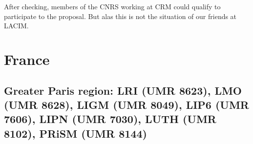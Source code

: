 After checking, members of the CNRS working at CRM could qualify to
participate to the proposal. But alas this is not the situation of our
friends at LACIM.

\section*{France}

\subsection*{Greater Paris region: LRI (UMR 8623),  LMO (UMR 8628), LIGM
  (UMR 8049), LIP6 (UMR 7606), LIPN (UMR 7030), LUTH (UMR 8102), PRiSM (UMR 8144)}


